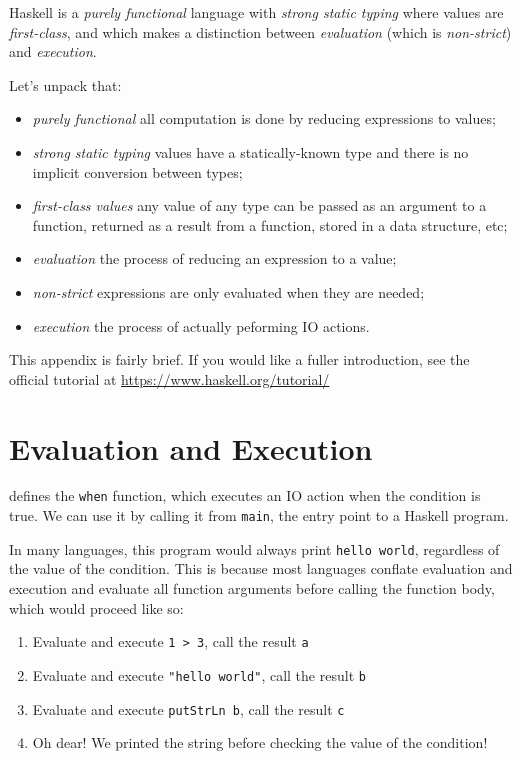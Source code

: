 \begin{figure}[b]
  \centering
  \hrulefill
  
  \label{fig:when}
\end{figure}

Haskell is a \emph{purely functional} language with \emph{strong static typing}
where values are \emph{first-class}, and which makes a distinction between
\emph{evaluation} (which is \emph{non-strict}) and \emph{execution}.

Let's unpack that:

\begin{itemize}
\item \emph{purely functional} all computation is done by reducing expressions
  to values;
\item \emph{strong static typing} values have a statically-known type and there
  is no implicit conversion between types;
\item \emph{first-class values} any value of any type can be passed as an
  argument to a function, returned as a result from a function, stored in a data
  structure, etc;
\item \emph{evaluation} the process of reducing an expression to a value;
\item \emph{non-strict} expressions are only evaluated when they are needed;
\item \emph{execution} the process of actually peforming IO actions.
\end{itemize}

This appendix is fairly brief.  If you would like a fuller introduction, see the
official tutorial at \url{https://www.haskell.org/tutorial/}

\section*{Evaluation and Execution}

 defines the \verb|when| function, which executes an IO action when
the condition is true.  We can use it by calling it from \verb|main|, the entry
point to a Haskell program.

In many languages, this program would always print \verb|hello world|,
regardless of the value of the condition.  This is because most languages
conflate evaluation and execution and evaluate all function arguments before
calling the function body, which would proceed like so:

\begin{enumerate}
\item Evaluate and execute \verb|1 > 3|, call the result \verb|a|
\item Evaluate and execute \verb|"hello world"|, call the result \verb|b|
\item Evaluate and execute \verb|putStrLn b|, call the result \verb|c|
\item Oh dear!  We printed the string before checking the value of the
  condition!
\end{enumerate}

